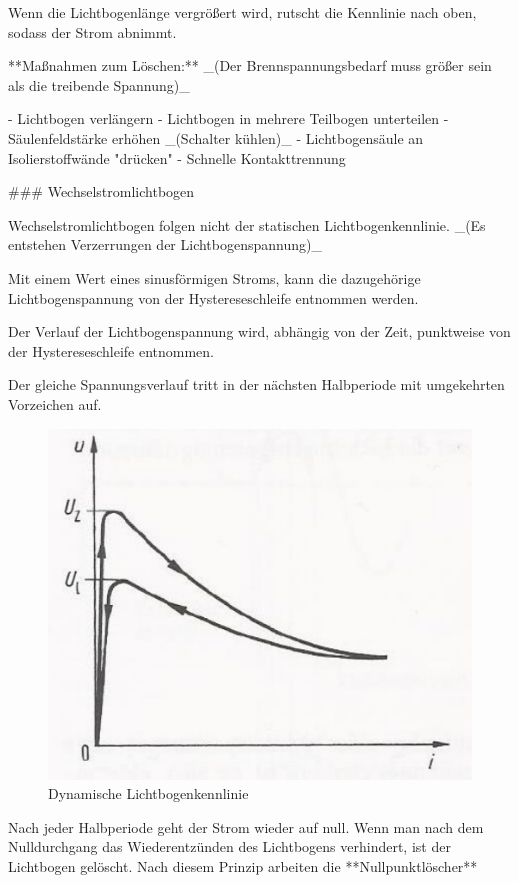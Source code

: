 \begin{markdown}
Wenn die Lichtbogenlänge vergrößert wird, rutscht die Kennlinie nach oben, sodass der Strom abnimmt.

**Maßnahmen zum Löschen:** _(Der Brennspannungsbedarf muss größer sein als die treibende Spannung)_

- Lichtbogen verlängern
- Lichtbogen in mehrere Teilbogen unterteilen
- Säulenfeldstärke erhöhen _(Schalter kühlen)_
- Lichtbogensäule an Isolierstoffwände "drücken"
- Schnelle Kontakttrennung 

\newpage

### Wechselstromlichtbogen

Wechselstromlichtbogen folgen nicht der statischen Lichtbogenkennlinie. _(Es entstehen Verzerrungen der Lichtbogenspannung)_

Mit einem Wert eines sinusförmigen Stroms, kann die dazugehörige Lichtbogenspannung von der Hystereseschleife entnommen werden.

Der Verlauf der Lichtbogenspannung wird, abhängig von der Zeit, punktweise von der Hystereseschleife entnommen. 

Der gleiche Spannungsverlauf tritt in der nächsten Halbperiode mit umgekehrten Vorzeichen auf.

\begin{figure}
    \centering
    \includegraphics[width=0.8\linewidth]{./images/10-Schaltanlagen/Lichtbogenkennlinie-Dynamisch.png}
    \caption[Dynamische Lichtbogenkennlinie]{Dynamische Lichtbogenkennlinie}
\end{figure}

Nach jeder Halbperiode geht der Strom wieder auf null. Wenn man nach dem Nulldurchgang das Wiederentzünden des Lichtbogens verhindert, ist der Lichtbogen gelöscht. Nach diesem Prinzip arbeiten die **Nullpunktlöscher**


\end{markdown}
